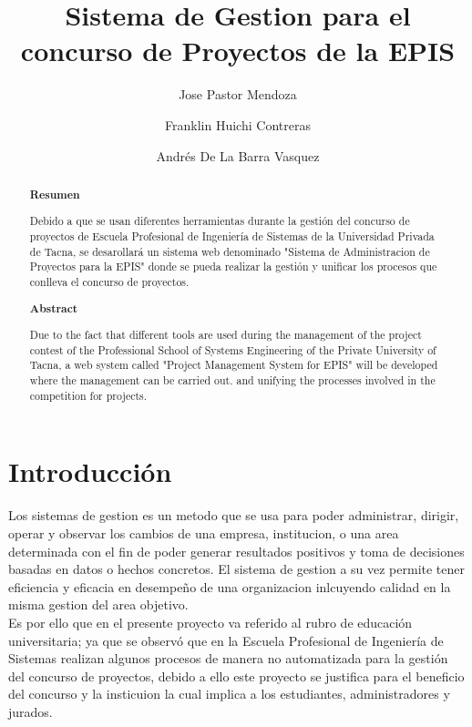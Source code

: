 \documentclass[%
 reprint,
 amsmath,amssymb,
 aps,
]{revtex4-1}
\begin{document}
\title{Sistema de Gestion para el concurso de Proyectos de la EPIS}
\author{Jose Pastor Mendoza}
\author{Franklin Huichi Contreras}
\author{Andrés De La Barra Vasquez}
%

\begin{abstract}
\begin{center}
\textbf{Resumen}
\end{center}
Debido a que se usan diferentes herramientas durante la gestión del concurso de proyectos de Escuela Profesional de Ingeniería de Sistemas de la Universidad Privada de Tacna, se desarollará un sistema web denominado "Sistema de Administracion de Proyectos para la EPIS" donde se pueda realizar la gestión y unificar los procesos que conlleva el concurso de proyectos.


\begin{center}
\textbf{Abstract}
\end{center}
Due to the fact that different tools are used during the management of the project contest of the Professional School of Systems Engineering of the Private University of Tacna, a web system called "Project Management System for EPIS" will be developed where the management can be carried out. and unifying the processes involved in the competition for projects.

\end{abstract}



\maketitle


\section {Introducción}

Los sistemas de gestion es un metodo que se usa para poder administrar, dirigir, operar y observar los cambios de una empresa, institucion, o una area determinada con el fin de poder generar resultados positivos y toma de decisiones basadas en datos o hechos concretos. El sistema de gestion a su vez permite tener eficiencia y eficacia en desempeño de una organizacion inlcuyendo calidad en la misma gestion del area objetivo.\\
Es por ello que en el presente proyecto va referido al rubro de educación universitaria; ya que se observó que en la Escuela Profesional de Ingeniería de Sistemas realizan algunos procesos de manera no automatizada para la gestión del concurso de proyectos, debido a ello este proyecto se justifica para el beneficio del concurso y la insticuion la cual implica a los estudiantes, administradores y jurados.
\end{document}
